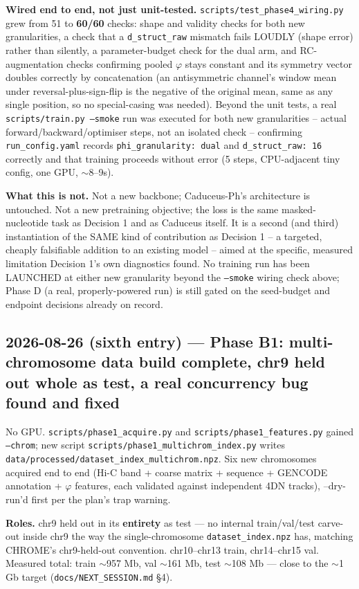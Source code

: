 \documentclass[11pt,a4paper]{article}
\newcommand{\code}[1]{\texttt{\small #1}}
\begin{document}
\textbf{Wired end to end, not just unit-tested.}
\code{scripts/test\_phase4\_wiring.py} grew from 51 to \textbf{60/60}
checks: shape and validity checks for both new granularities, a check that a
\code{d\_struct\_raw} mismatch fails LOUDLY (shape error) rather than
silently, a parameter-budget check for the dual arm, and RC-augmentation
checks confirming pooled $\varphi$ stays constant and its symmetry vector
doubles correctly by concatenation (an antisymmetric channel's window mean
under reversal-plus-sign-flip is the negative of the original mean, same as
any single position, so no special-casing was needed). Beyond the unit
tests, a real \code{scripts/train.py --smoke} run was executed for both new
granularities -- actual forward/backward/optimiser steps, not an isolated
check -- confirming \code{run\_config.yaml} records
\code{phi\_granularity: dual} and \code{d\_struct\_raw: 16} correctly and
that training proceeds without error (5 steps, CPU-adjacent tiny config,
one GPU, $\sim$8--9s).

\textbf{What this is not.} Not a new backbone; Caduceus-Ph's architecture is
untouched. Not a new pretraining objective; the loss is the same
masked-nucleotide task as Decision 1 and as Caduceus itself. It is a second
(and third) instantiation of the SAME kind of contribution as Decision 1 --
a targeted, cheaply falsifiable addition to an existing model -- aimed at
the specific, measured limitation Decision 1's own diagnostics found. No
training run has been LAUNCHED at either new granularity beyond the
\code{--smoke} wiring check above; Phase D (a real, properly-powered run)
is still gated on the seed-budget and endpoint decisions already on record.

\subsection*{2026-08-26 (sixth entry) --- Phase B1: multi-chromosome data build
complete, chr9 held out whole as test, a real concurrency bug found and fixed}

No GPU. \code{scripts/phase1\_acquire.py} and \code{scripts/phase1\_features.py}
gained \code{--chrom}; new script \code{scripts/phase1\_multichrom\_index.py}
writes \code{data/processed/dataset\_index\_multichrom.npz}. Six new
chromosomes acquired end to end (Hi-C band + coarse matrix + sequence +
GENCODE annotation + $\varphi$ features, each validated against independent
4DN tracks), --dry-run'd first per the plan's trap warning.

\textbf{Roles.} chr9 held out in its \textbf{entirety} as test --- no internal
train/val/test carve-out inside chr9 the way the single-chromosome
\code{dataset\_index.npz} has, matching CHROME's chr9-held-out convention.
chr10--chr13 train, chr14--chr15 val. Measured total: train
$\sim$957 Mb, val $\sim$161 Mb, test $\sim$108 Mb --- close to the $\sim$1 Gb
target (\code{docs/NEXT\_SESSION.md} \S4).
\end{document}
